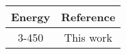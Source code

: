 \begin{tabular}{|c||c|} 
    \hline 
    \bf{Energy} & \bf{Reference} \\
    \hline
    \hline 
    3-450 & This work \\
    \hline
\end{tabular}

